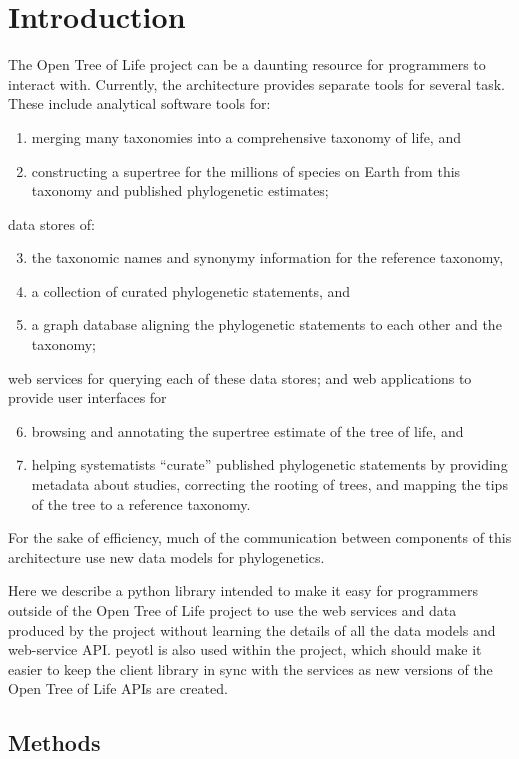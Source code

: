 \documentclass{bioinfo}
\newcommand{\pey}{peyotl\xspace}
\newcommand{\otol}{Open Tree of Life\xspace}
\begin{document}
\section{Introduction}
The \otol project can be a daunting resource for programmers to interact with.
Currently, the architecture provides separate tools for several task.
These include analytical software tools for:
\begin{enumerate}
    \item merging many taxonomies into a comprehensive taxonomy of life, and
    \item constructing a supertree for the millions of species on Earth from this 
            taxonomy and published phylogenetic estimates;
\end{enumerate}
data stores of:
\begin{enumerate}
   \setcounter{enumi}{2}
    \item the taxonomic names and synonymy information for the reference taxonomy,
    \item a collection of curated phylogenetic statements, and
    \item a graph database aligning the phylogenetic statements to each other and the taxonomy;
\end{enumerate}
web services for querying each of these data stores; and web applications to provide
user interfaces for
\begin{enumerate}
   \setcounter{enumi}{5}
    \item browsing and annotating the supertree estimate of the tree of life, and
    \item helping systematists ``curate'' published phylogenetic statements by providing
        metadata about studies, correcting the rooting of trees, and mapping the tips
        of the tree to a reference taxonomy.
\end{enumerate}
For the sake of efficiency, much of the communication between components of this architecture
use new data models for phylogenetics.

Here we describe a python library intended to make it easy for programmers outside
    of the \otol project to use the web services and data produced by the project without
    learning the details of all the data models and web-service API.
\pey is also used within the project, which should make it easier to keep the client library
     in sync with the services as new versions of the \otol APIs are created.


\begin{methods}
\section{Methods}
\end{methods}
\end{document}
